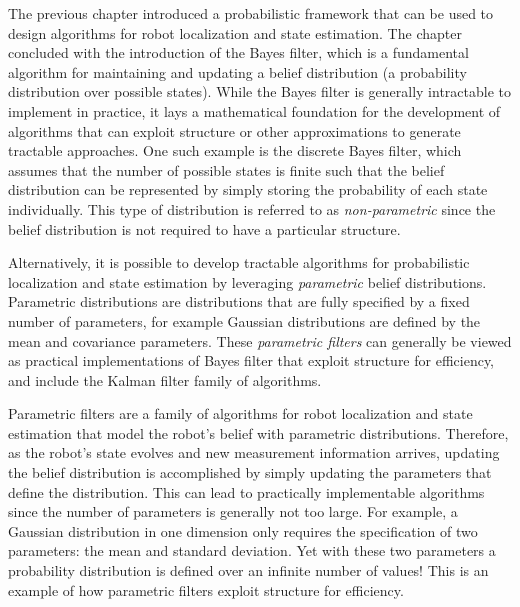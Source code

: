 The previous chapter introduced a probabilistic framework that can be used to design algorithms for robot localization and state estimation. The chapter concluded with the introduction of the Bayes filter, which is a fundamental algorithm for maintaining and updating a belief distribution (a probability distribution over possible states). While the Bayes filter is generally intractable to implement in practice, it lays a mathematical foundation for the development of algorithms that can exploit structure or other approximations to generate tractable approaches. One such example is the discrete Bayes filter, which assumes that the number of possible states is finite such that the belief distribution can be represented by simply storing the probability of each state individually. This type of distribution is referred to as \textit{non-parametric} since the belief distribution is not required to have a particular structure.

Alternatively, it is possible to develop tractable algorithms for probabilistic localization and state estimation by leveraging \textit{parametric} belief distributions. Parametric distributions are distributions that are fully specified by a fixed number of parameters, for example Gaussian distributions are defined by the mean and covariance parameters. These \textit{parametric filters} can generally be viewed as practical implementations of Bayes filter that exploit structure for efficiency, and include the Kalman filter family of algorithms.

Parametric filters\cite{ThrunBurgardEtAl2005} are a family of algorithms for robot localization and state estimation that model the robot's belief with parametric distributions. Therefore, as the robot's state evolves and new measurement information arrives, updating the belief distribution is accomplished by simply updating the parameters that define the distribution. This can lead to practically implementable algorithms since the number of parameters is generally not too large. For example, a Gaussian distribution in one dimension only requires the specification of two parameters: the mean and standard deviation. Yet with these two parameters a probability distribution is defined over an infinite number of values! This is an example of how parametric filters exploit structure for efficiency.

